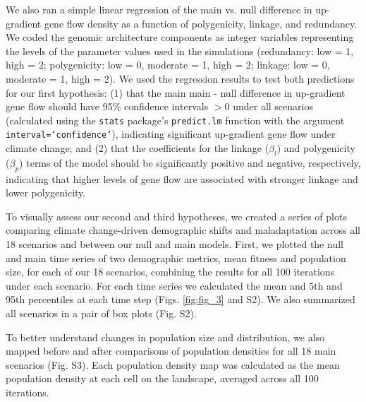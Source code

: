 \documentclass[9pt,twocolumn,twoside,lineno]{new_article}
\begin{document}
We also ran a simple linear regression
of the main vs. null difference in up-gradient gene flow density
as a function of polygenicity, linkage, and redundancy. We coded the genomic architecture components
as integer variables
representing the levels of the
parameter values used in the simulations (redundancy: low = 1, high = 2;
polygenicity: low = 0, moderate = 1, high = 2;
linkage: low = 0, moderate = 1, high = 2).
We used the regression results
to test both predictions for our first hypothesis: (1) that the main main - null difference in up-gradient gene flow
should have 95\% confidence intervals $>0$ under all scenarios
(calculated using the \texttt{stats} package's \texttt{predict.lm} function with
the argument \texttt{interval=`confidence'}),
indicating significant up-gradient gene flow under climate change; and (2) that the coefficients for the linkage ($\beta_{l}$) and polygenicity ($\beta_{p}$)
terms of the model should be significantly positive and
negative, respectively, indicating that higher levels of gene flow are associated with stronger linkage and lower polygenicity.

To visually assess our second and third hypotheses, we created a series of
plots comparing climate change-driven demographic shifts
and maladaptation across all 18 scenarios and between our null and main models.
First, we plotted the 
null and main time series of two demographic
metrics, mean fitness and population size, for 
each of our 18 scenarios, combining the results for all 100 iterations under each scenario. For each time series we calculated the mean and 5th and 95th percentiles at each time step (Figs. \ref{fig:fig_3} and S2).
We also summarized all scenarios in a pair of box plots (Fig. S2).

To better understand changes in population size and distribution,
we also mapped before and after comparisons of population densities for all 18
main scenarios (Fig. S3).
Each population density map was calculated as
the mean population density at each cell on the landscape,
averaged across all 100 iterations.
\end{document}
